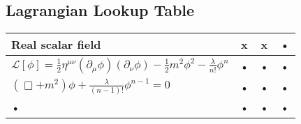 \documentclass[../main.tex]{subfiles}
\begin{document}
\subsection{Lagrangian Lookup Table}

\begin{center}

\begin{tabular}{|l|c|c|c|}
\hline 
Real scalar field & 
x & 
x & 
• \\ 
\hline 
$\mathcal{L}[\phi]=\frac{1}{2}\eta^{\mu\nu}(\partial_\mu\phi)(\partial_\nu\phi)-\frac{1}{2}m^2\phi^2-\frac{\lambda}{n!}\phi^n$ & • & • & • \\ 
\hline 
$(\Box+m^2)\phi+\frac{\lambda}{(n-1)!}\phi^{n-1}=0$ & • & • & • \\ 
\hline 
• & • & • & • \\ 
\hline 
\end{tabular} 
\end{center}
\end{document}
